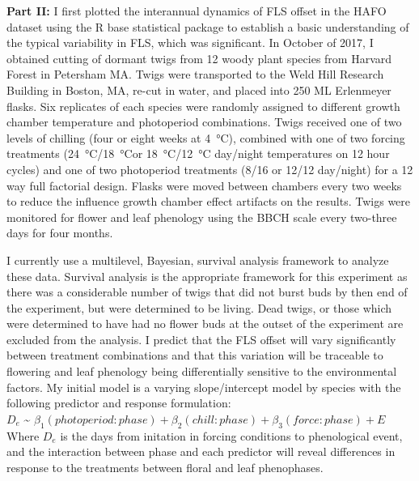 \documentclass[12pt]{article}\usepackage[]{graphicx}\usepackage[]{color}
\begin{document}
\indent\textbf{Part II:} I first plotted the interannual dynamics of FLS offset in the HAFO dataset using the R base statistical package to establish a basic understanding of the typical variability in FLS, which was significant. In October of 2017, I obtained cutting of dormant twigs from 12 woody plant species from Harvard Forest in Petersham MA. Twigs were transported to the Weld Hill Research Building in Boston, MA, re-cut in water, and placed into 250 ML Erlenmeyer flasks. Six replicates of each species were randomly assigned to different growth chamber temperature and photoperiod combinations. Twigs received one of two levels of chilling (four or eight weeks at \SI{4}{\degreeCelsius}), combined with one of two forcing treatments (\SI{24}{\degreeCelsius}/\SI{18}{\degreeCelsius}or \SI{18}{\degreeCelsius}/\SI{12}{\degreeCelsius} day/night temperatures on 12 hour cycles) and one of two photoperiod treatments (8/16 or 12/12 day/night) for a 12 way full factorial design. Flasks were moved between chambers every two weeks to reduce the influence growth chamber effect artifacts on the results. Twigs were monitored for flower and leaf phenology using the BBCH scale \citep{Finn2007} every two-three days for four months.
\par I currently  use a multilevel, Bayesian, survival analysis framework to analyze these data. Survival analysis is the appropriate framework for this experiment as there was a considerable number of twigs that did not burst buds by then end of the experiment, but were determined to be living. Dead twigs, or those which were determined to have had no flower buds at the outset of the experiment are excluded from the analysis. I predict that the FLS offset will vary significantly between treatment combinations and that this variation will be traceable to flowering and leaf phenology being differentially sensitive to the environmental factors. My initial model is a varying slope/intercept model by species with the following predictor and response formulation:\\
\indent$D_e$ \~{} $\beta_1(photoperiod:phase)+\beta_2(chill:phase)+\beta_3 (force:phase)+E $\\
Where $D_e$ is the days from initation in forcing conditions to phenological event, and the interaction between phase and each predictor will reveal differences in response to the treatments between floral and leaf phenophases.
\end{document}
